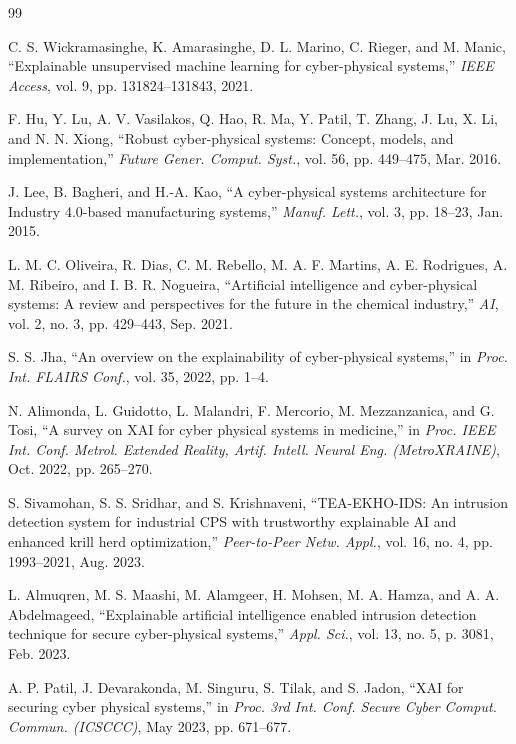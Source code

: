 \documentclass[a4paper,fleqn]{cas-dc}
\begin{document}
\begin{thebibliography}{99}

C. S. Wickramasinghe, K. Amarasinghe, D. L. Marino, C. Rieger, and M. Manic, ``Explainable unsupervised machine learning for cyber-physical systems,'' \emph{IEEE Access}, vol. 9, pp. 131824--131843, 2021.

F. Hu, Y. Lu, A. V. Vasilakos, Q. Hao, R. Ma, Y. Patil, T. Zhang, J. Lu, X. Li, and N. N. Xiong, ``Robust cyber-physical systems: Concept, models, and implementation,'' \emph{Future Gener. Comput. Syst.}, vol. 56, pp. 449--475, Mar. 2016.

J. Lee, B. Bagheri, and H.-A. Kao, ``A cyber-physical systems architecture for Industry 4.0-based manufacturing systems,'' \emph{Manuf. Lett.}, vol. 3, pp. 18--23, Jan. 2015.

L. M. C. Oliveira, R. Dias, C. M. Rebello, M. A. F. Martins, A. E. Rodrigues, A. M. Ribeiro, and I. B. R. Nogueira, ``Artificial intelligence and cyber-physical systems: A review and perspectives for the future in the chemical industry,'' \emph{AI}, vol. 2, no. 3, pp. 429--443, Sep. 2021.

S. S. Jha, ``An overview on the explainability of cyber-physical systems,'' in \emph{Proc. Int. FLAIRS Conf.}, vol. 35, 2022, pp. 1--4.

N. Alimonda, L. Guidotto, L. Malandri, F. Mercorio, M. Mezzanzanica, and G. Tosi, ``A survey on XAI for cyber physical systems in medicine,'' in \emph{Proc. IEEE Int. Conf. Metrol. Extended Reality, Artif. Intell. Neural Eng. (MetroXRAINE)}, Oct. 2022, pp. 265--270.

S. Sivamohan, S. S. Sridhar, and S. Krishnaveni, ``TEA-EKHO-IDS: An intrusion detection system for industrial CPS with trustworthy explainable AI and enhanced krill herd optimization,'' \emph{Peer-to-Peer Netw. Appl.}, vol. 16, no. 4, pp. 1993--2021, Aug. 2023.

L. Almuqren, M. S. Maashi, M. Alamgeer, H. Mohsen, M. A. Hamza, and A. A. Abdelmageed, ``Explainable artificial intelligence enabled intrusion detection technique for secure cyber-physical systems,'' \emph{Appl. Sci.}, vol. 13, no. 5, p. 3081, Feb. 2023.

A. P. Patil, J. Devarakonda, M. Singuru, S. Tilak, and S. Jadon, ``XAI for securing cyber physical systems,'' in \emph{Proc. 3rd Int. Conf. Secure Cyber Comput. Commun. (ICSCCC)}, May 2023, pp. 671--677.


\end{thebibliography}
\end{document}
